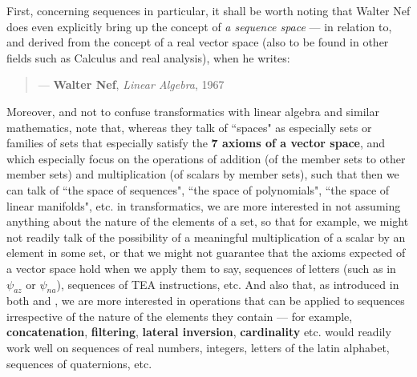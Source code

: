 \documentclass[a4paper, 18pt]{book} %
\begin{document}
\begin{appendices}
\vspace{2em}

First, concerning sequences in particular, it shall be worth noting that Walter Nef does even explicitly bring up the concept of \textit{a sequence space} --- in relation to, and derived from the concept of a real vector space (also to be found in other fields such as Calculus and real analysis), when he writes:

\vspace{2em}

\noindent
\begin{minipage}{1\textwidth}
\vspace{1em}
\begin{quotation}
\hspace*{\fill} --- \textbf{Walter Nef}, \textit{Linear Algebra}, 1967\cite{nef1967linear}
\end{quotation}
\vspace{1em}
\end{minipage}

\vspace{2em}


Moreover, and not to confuse transformatics with linear algebra and similar mathematics, note that, whereas they talk of ``spaces" as especially sets or families of sets that especially satisfy the \textbf{7 axioms of a vector space}, and which especially focus on the operations of addition (of the member sets to other member sets) and multiplication (of scalars by member sets), such that then we can talk of ``the space of sequences", ``the space of polynomials", ``the space of linear manifolds", etc. in transformatics, we are more interested in not assuming anything about the nature of the elements of a set, so that for example, we might not readily talk of the possibility of a meaningful multiplication of a scalar by an element in some set, or that we might not guarantee that the axioms expected of a vector space hold when we apply them to say, sequences of letters (such as in $\psi_{az}$ or $\psi_{na}$), sequences of TEA instructions, etc. And also that, as introduced in both \cite{transformatics} and \cite{treealgebras_review}, we are more interested in operations that can be applied to sequences irrespective of the nature of the elements they contain --- for example, \textbf{concatenation}, \textbf{filtering}, \textbf{lateral inversion}, \textbf{cardinality} etc. would readily work well on sequences of real numbers, integers, letters of the latin alphabet, sequences of quaternions, etc.


\end{appendices}
\end{document}
